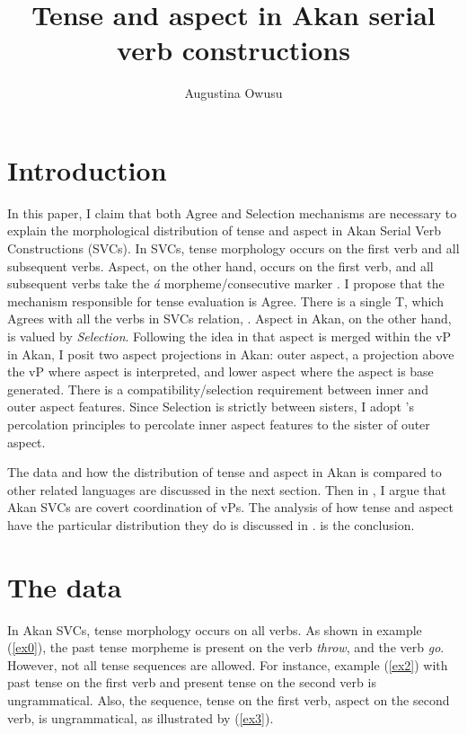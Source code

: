 \documentclass[output=paper,colorlinks,citecolor=brown]{langscibook}
\title{Tense and aspect in Akan serial verb constructions}
\author{Augustina Owusu\affiliation{Boston College}}
\begin{document}
\maketitle 

\section{Introduction}\label{sec:owusu:1}

In this paper, I claim that both Agree and Selection mechanisms are necessary to explain the morphological distribution of tense and aspect in Akan Serial Verb Constructions (SVCs). In SVCs, tense morphology occurs on the first verb and all subsequent verbs. Aspect, on the other hand, occurs on the first verb, and all subsequent verbs take the \emph{\'a} morpheme\slash consecutive marker \citep{Dolphyne1996, Osam2003}. I propose that the mechanism responsible for tense evaluation is Agree. There is a single T, which Agrees with all the verbs in SVCs relation, \citep{PesetskyTorrego2007}.  Aspect in Akan, on the other hand, is valued by \emph{Selection}. Following the idea in \citet{Kandybowicz2010, Kandybowicz2015} that aspect is merged within the vP in Akan, I posit two aspect projections in Akan: outer aspect, a projection above the vP where aspect is interpreted, and lower aspect where the aspect is base generated.  There is a compatibility/selection requirement between inner and outer aspect features. Since Selection is strictly between sisters, I adopt \citet{Webelhuth1992}'s percolation principles to percolate inner aspect features to the sister of outer aspect.

The data and how the distribution of tense and aspect in Akan is compared to other related languages are discussed in the next section. Then in , I argue that Akan SVCs are covert coordination of vPs. The analysis of how tense and aspect have the particular distribution they do is discussed in .  is the conclusion.  

\section{The data}\label{sec:owusu:2}
In Akan SVCs, tense morphology occurs on all verbs. As shown in example (\ref{ex0}), the past tense morpheme is present on the verb \emph{throw}, and the verb \emph{go}. However, not all tense sequences are allowed. For instance, example (\ref{ex2}) with past tense on the first verb and present tense on the second verb is ungrammatical. Also, the sequence, tense on the first verb, aspect on the second verb, is ungrammatical, as illustrated by (\ref{ex3}). 
 
\end{document}
